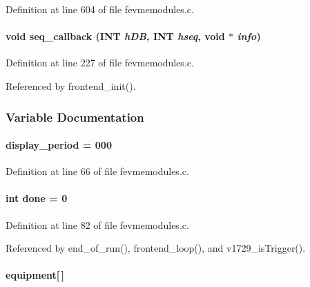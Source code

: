 Definition at line 604 of file fevmemodules.c.
\paragraph[{seq\_\-callback}]{\setlength{\rightskip}{0pt plus 5cm}void seq\_\-callback ({\bf INT} {\em hDB}, \/  {\bf INT} {\em hseq}, \/  void $\ast$ {\em info})}\hfill\label{fevmemodules_8c_a0dc058822b97bbd8a5f918f0213e4a9e}


Definition at line 227 of file fevmemodules.c.

Referenced by frontend\_\-init().

\subsubsection{Variable Documentation}
\paragraph[{display\_\-period}]{ {\bf display\_\-period} = 000}\hfill\label{fevmemodules_8c_ab9cdcefda91459091b0ed33011d0d18c}


Definition at line 66 of file fevmemodules.c.
\paragraph[{done}]{\setlength{\rightskip}{0pt plus 5cm}int {\bf done} = 0}\hfill\label{fevmemodules_8c_a5992b274cfdcacdbc1fa8347fd01ebde}


Definition at line 82 of file fevmemodules.c.

Referenced by end\_\-of\_\-run(), frontend\_\-loop(), and v1729\_\-isTrigger().
\paragraph[{equipment}]{ {\bf equipment}\mbox{[}$\,$\mbox{]}}\hfill\label{fevmemodules_8c_aa86ef8764826784b74603ffb23852283}


